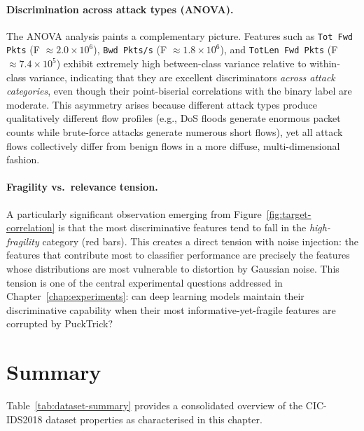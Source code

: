 \paragraph{Discrimination across attack types (ANOVA).}
The ANOVA analysis paints a complementary picture.  Features such as
\texttt{Tot Fwd Pkts} (F $\approx 2.0 \times 10^6$), \texttt{Bwd Pkts/s} (F
$\approx 1.8 \times 10^6$), and \texttt{TotLen Fwd Pkts} (F $\approx 7.4
\times 10^5$) exhibit extremely high between-class variance relative to
within-class variance, indicating that they are excellent discriminators
\emph{across attack categories}, even though their point-biserial correlations
with the binary label are moderate.  This asymmetry arises because different
attack types produce qualitatively different flow profiles (e.g., DoS floods
generate enormous packet counts while brute-force attacks generate numerous
short flows), yet all attack flows collectively differ from benign flows in a
more diffuse, multi-dimensional fashion.

\paragraph{Fragility vs.\ relevance tension.}
A particularly significant observation emerging from
Figure~\ref{fig:target-correlation} is that the most discriminative features
tend to fall in the \emph{high-fragility} category (red bars).  This creates a
direct tension with noise injection: the features that contribute most to
classifier performance are precisely the features whose distributions are most
vulnerable to distortion by Gaussian noise.  This tension is one of the central
experimental questions addressed in Chapter~\ref{chap:experiments}: can deep
learning models maintain their discriminative capability when their most
informative-yet-fragile features are corrupted by PuckTrick?

\section{Summary}
\label{sec:dataset-summary}

Table~\ref{tab:dataset-summary} provides a consolidated overview of the
CIC-IDS2018 dataset properties as characterised in this chapter.

